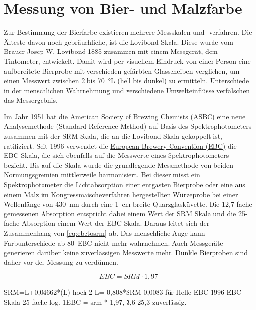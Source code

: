 \documentclass[a4paper,parskip=half]{scrartcl}
\newcommand{\EBC}{\mathit{EBC}}
\newcommand{\SRM}{\mathit{SRM}}
\begin{document}
\section*{Messung von Bier- und Malzfarbe}

Zur Bestimmung der Bierfarbe existieren mehrere Messskalen und -verfahren. Die Älteste davon noch gebräuchliche, ist die Lovibond Skala. Diese wurde vom Brauer Josep W. Lovibond 1885 zusammen mit einem Messgerät, dem Tintometer, entwickelt. Damit wird per visuellem Eindruck von einer Person eine aufbereitete Bierprobe mit verschieden gefärbten Glasscheiben verglichen, um einen Messwert zwischen 2 bis 70~°L (hell bis dunkel) zu ermitteln. Unterschiede in der menschlichen Wahrnehmung und verschiedene Umwelteinflüsse verfälschen das Messergebnis. \parencite{KrausWeyermann2021a}

Im Jahr 1951 hat die \href{https://www.asbcnet.org}{American Society of Brewing Chemists (ASBC)} eine neue Analysemethode (Standard Reference Method) auf Basis des Spektrophotometers zusammen mit der SRM Skala, die an die Lovibond Skala gekoppelt ist, ratifiziert. Seit 1996 verwendet die \href{https://europeanbreweryconvention.eu}{European Brewery Convention (EBC)} die EBC Skala, die sich ebenfalls auf die Messwerte eines Spektrophotometers bezieht. Bis auf die Skala wurde die grundlegende Messmethode von beiden Normungsgremien mittlerweile harmonisiert. Bei dieser misst ein Spektrophotometer die Lichtabsorption einer entgasten Bierprobe oder eine aus einem Malz im Kongressmaischeverfahren hergestellten Würzeprobe bei einer Wellenlänge von 430~nm durch eine 1~cm breite Quarzglasküvette. Die 12,7-fache gemessenen Absorption entspricht dabei  einem Wert der SRM Skala und die 25-fache Absorption einem Wert der EBC Skala. Daraus leitet sich der Zusammenhang von \autoref{eq:ebctosrm} ab. Das menschliche Auge kann Farbunterschiede ab 80~EBC nicht mehr wahrnehmen. Auch Messgeräte generieren darüber keine zuverlässigen Messwerte mehr. Dunkle Bierproben sind daher vor der Messung zu verdünnen. \parencite{KrausWeyermann2021a}

\begin{equation}
\EBC = \SRM \cdot 1,97
\label{eq:ebctosrm}
\end{equation}



\parencite{KrausWeyermann2021a}
SRM=L+0,04662*(L) hoch 2
L= 0,808*SRM-0,0083 für Helle
EBC 1996 EBC Skala 25-fache log. 1EBC = srm * 1,97,
3,6-25,3 zuverlässig. 
\end{document}
